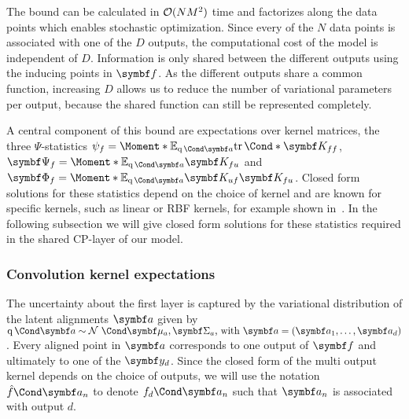 The bound can be calculated in $\operatorname{\mathcal{O}}(NM^2)$ time and factorizes along the data points which enables stochastic optimization.
Since every of the $N$ data points is associated with one of the $D$ outputs, the computational cost of the model is independent of $D$.
Information is only shared between the different outputs using the inducing points in $\mat{f}$.
As the different outputs share a common function, increasing $D$ allows us to reduce the number of variational parameters per output, because the shared function can still be represented completely.

A central component of this bound are expectations over kernel matrices, the three $\Psi$-statistics $\psi_f = \Moment*{\E_{\Variat{\rv{a}}}}{\Fun*{\tr}{\mat{K_{ff}}}}$, $\mat{\Psi_f} = \Moment*{\E_{\Variat{\rv{a}}}}{\mat{K_{fu}}}$ and $\mat{\Phi_f} = \Moment*{\E_{\Variat{\rv{a}}}}{\mat{K_{uf}}\mat{K_{fu}}}$.
Closed form solutions for these statistics depend on the choice of kernel and are known for specific kernels, such as linear or RBF kernels, for example shown in~\parencite{damianou_deep_2013}.
In the following subsection we will give closed form solutions for these statistics required in the shared CP-layer of our model.

\subsubsection{Convolution kernel expectations}
The uncertainty about the first layer is captured by the variational distribution of the latent alignments $\rv{a}$ given by $\Variat{\rv{a}} \sim \Gaussian{\mat{\mu}_a, \mat{\Sigma}_a}\text{, with } \rv{a} = \left( \rv{a}_1, \dots, \rv{a}_d \right)$.
Every aligned point in $\rv{a}$ corresponds to one output of $\rv{f}$ and ultimately to one of the $\rv{y}_d$.
Since the closed form of the multi output kernel depends on the choice of outputs, we will use the notation $\Fun{\hat{f}}{\rv{a}_n}$ to denote $\Fun{f_d}{\rv{a}_n}$ such that $\rv{a}_n$ is associated with output $d$.

